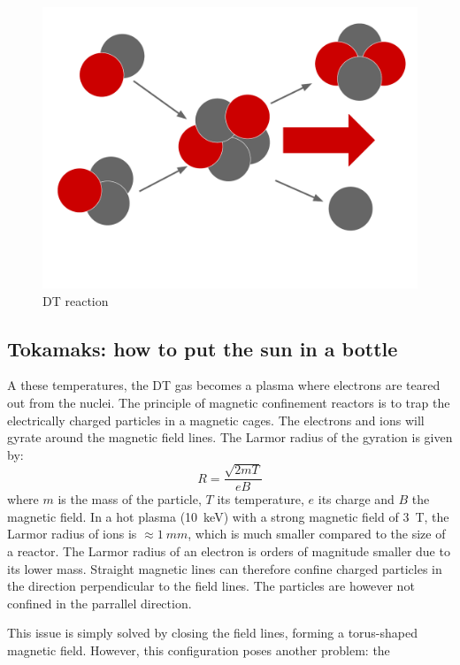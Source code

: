 \begin{figure} [h]
    \centering
    \includegraphics[width=\linewidth]{Figures/Chapter1/nuc_fus.pdf}
    \caption{DT reaction}
\end{figure}

\subsection{Tokamaks: how to put the sun in a bottle}

A these temperatures, the DT gas becomes a plasma where electrons are teared out from the nuclei.
The principle of magnetic confinement reactors is to trap the electrically charged particles in a magnetic cages.
The electrons and ions will gyrate around the magnetic field lines.
The Larmor radius of the gyration is given by:
\begin{equation}
    R =  \frac{\sqrt{2 m T}}{e B}
\end{equation}
where $m$ is the mass of the particle, $T$ its temperature, $e$ its charge and $B$ the magnetic field.
In a hot plasma (\SI{10}{keV}) with a strong magnetic field of \SI{3}{T}, the Larmor radius of ions is $\approx \SI{1}{mm}$, which is much smaller compared to the size of a reactor.
The Larmor radius of an electron is orders of magnitude smaller due to its lower mass.
Straight magnetic lines can therefore confine charged particles in the direction perpendicular to the field lines.
The particles are however not confined in the parrallel direction.

This issue is simply solved by closing the field lines, forming a torus-shaped magnetic field.
However, this configuration poses another problem: the 

